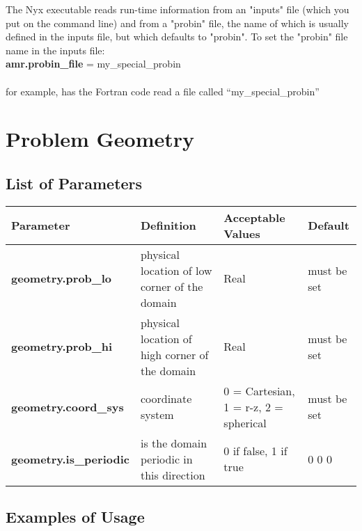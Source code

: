 The Nyx executable reads run-time information from an "inputs" file (which you put on the command line) 
and from a "probin" file, the name of which is usually defined in the inputs file, but which defaults to "probin".  
To set the "probin" file name in the inputs file:\\

{\bf amr.probin\_file} = my\_special\_probin\\ \\
for example, has the Fortran code read a file called ``my\_special\_probin''

\section{Problem Geometry}

\subsection{List of Parameters}

\begin{table*}[h]
\begin{scriptsize}
\begin{tabular}{|l|l|l|l|} \hline
Parameter & Definition & Acceptable Values & Default \\
\hline
{\bf geometry.prob\_lo} & physical location of low corner of the domain & Real & must be set\\
{\bf geometry.prob\_hi} & physical location of high corner of the domain & Real  & must be set\\
{\bf geometry.coord\_sys} & coordinate system & 0 = Cartesian, 1 = r-z, 2 = spherical & must be set \\
{\bf geometry.is\_periodic} & is the domain periodic in this direction & 0 if false, 1 if true  & 0 0 0 \\
\hline
\end{tabular}
\label{Table:Geometry}
\end{scriptsize}
\end{table*}

\subsection{Examples of Usage}

